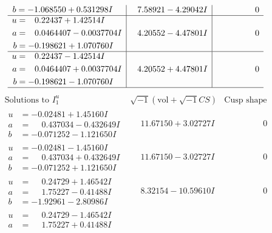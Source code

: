 \documentclass[1p]{elsarticle_modified}
\theoremstyle{definition}
\newcommand{\I}{\sqrt{-1}}
\begin{document}
$$\begin{array}{c|c|c}
\begin{aligned}
b &= -1.068550 + 0.531298 I\end{aligned}
 & \phantom{-}7.58921 - 4.29042 I & \phantom{-0.000000 } 0 \\ \hline\begin{aligned}
u &= \phantom{-}0.22437 + 1.42514 I \\
a &= \phantom{-}0.0464407 - 0.0037704 I \\
b &= -0.198621 + 1.070760 I\end{aligned}
 & \phantom{-}4.20552 - 4.47801 I & \phantom{-0.000000 } 0 \\ \hline\begin{aligned}
u &= \phantom{-}0.22437 - 1.42514 I \\
a &= \phantom{-}0.0464407 + 0.0037704 I \\
b &= -0.198621 - 1.070760 I\end{aligned}
 & \phantom{-}4.20552 + 4.47801 I & \phantom{-0.000000 } 0\\
 \hline 
 \end{array}$$\newpage$$\begin{array}{c|c|c}  
\text{Solutions to }I^u_{1}& \I (\text{vol} + \sqrt{-1}CS) & \text{Cusp shape}\\
 \hline 
\begin{aligned}
u &= -0.02481 + 1.45160 I \\
a &= \phantom{-}0.437034 - 0.432649 I \\
b &= -0.071252 - 1.121650 I\end{aligned}
 & \phantom{-}11.67150 + 3.02727 I & \phantom{-0.000000 } 0 \\ \hline\begin{aligned}
u &= -0.02481 - 1.45160 I \\
a &= \phantom{-}0.437034 + 0.432649 I \\
b &= -0.071252 + 1.121650 I\end{aligned}
 & \phantom{-}11.67150 - 3.02727 I & \phantom{-0.000000 } 0 \\ \hline\begin{aligned}
u &= \phantom{-}0.24729 + 1.46542 I \\
a &= \phantom{-}1.75227 - 0.41488 I \\
b &= -1.92961 - 2.80986 I\end{aligned}
 & \phantom{-}8.32154 - 10.59610 I & \phantom{-0.000000 } 0 \\ \hline\begin{aligned}
u &= \phantom{-}0.24729 - 1.46542 I \\
a &= \phantom{-}1.75227 + 0.41488 I \\

\end{aligned}
\end{array}$$
\end{document}
